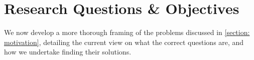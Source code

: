 \section{Research Questions \& Objectives}
\label{section: research objectives}

We now develop a more thorough framing of the problems discussed in \cref{section: motivation}, detailing the current view on what the correct questions are, and how we undertake finding their solutions.









